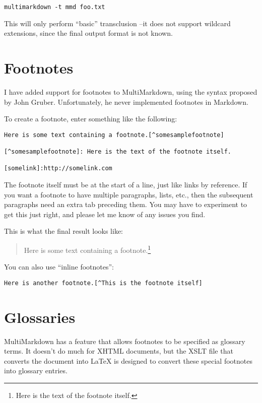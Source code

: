 \begin{verbatim}
multimarkdown -t mmd foo.txt
\end{verbatim}

This will only perform ``basic'' transclusion --it does not support wildcard extensions, since the final output format is not known.

\section{Footnotes}
\label{footnotes}

I have added support for footnotes to MultiMarkdown, using the syntax proposed by John Gruber. Unfortunately, he never implemented footnotes in Markdown.

To create a footnote, enter something like the following:

\begin{verbatim}
Here is some text containing a footnote.[^somesamplefootnote]

[^somesamplefootnote]: Here is the text of the footnote itself.

[somelink]:http://somelink.com
\end{verbatim}

The footnote itself must be at the start of a line, just like links by reference. If you want a footnote to have multiple paragraphs, lists, etc., then the subsequent paragraphs need an extra tab preceding them. You may have to experiment to get this just right, and please let me know of any issues you find.

This is what the final result looks like:

\begin{quote}
Here is some text containing a footnote.\footnote{Here is the text of the footnote itself.}
\end{quote}

You can also use ``inline footnotes'':

\begin{verbatim}
Here is another footnote.[^This is the footnote itself]
\end{verbatim}

\section{Glossaries}
\label{glossaries}

MultiMarkdown has a feature that allows footnotes to be specified as glossary terms. It doesn't do much for XHTML documents, but the XSLT file that converts the document into LaTeX is designed to convert these special footnotes into glossary entries.

